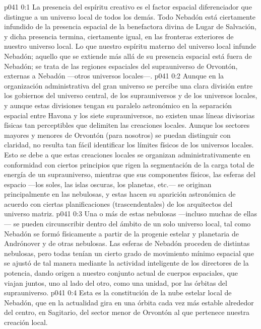 \author{Arcángel}
\vs p041 0:1 La presencia del espíritu creativo es el factor espacial diferenciador que distingue a un universo local de todos los demás. Todo Nebadón está ciertamente infundido de la presencia espacial de la benefactora divina de Lugar de Salvación, y dicha presencia termina, ciertamente igual, en las fronteras exteriores de nuestro universo local. Lo que nuestro espíritu materno del universo local infunde  Nebadón; aquello que se extiende más allá de su presencia espacial está fuera de Nebadón; se trata de las regiones espaciales del suprauniverso de Orvontón, externas a Nebadón ---otros universos locales---.
\vs p041 0:2 \pc Aunque en la organización administrativa del gran universo se percibe una clara división entre los gobiernos del universo central, de los suprauniversos y de los universos locales, y aunque estas divisiones tengan su paralelo astronómico en la separación espacial entre Havona y los siete suprauniversos, no existen unas líneas divisorias físicas tan perceptibles que delimiten las creaciones locales. Aunque los sectores mayores y menores de Orvontón (para nosotros) se puedan distinguir con claridad, no resulta tan fácil identificar los límites físicos de los universos locales. Esto se debe a que estas creaciones locales se organizan administrativamente en conformidad con ciertos principios  que rigen la segmentación de la carga total de energía de un suprauniverso, mientras que sus componentes físicos, las esferas del espacio ---los soles, las islas oscuras, los planetas, etc.--- se originan principalmente en las nebulosas, y estas hacen su aparición astronómica de acuerdo con ciertas planificaciones  (trascendentales) de los arquitectos del universo matriz.
\vs p041 0:3 Una o más de estas nebulosas ---incluso muchas de ellas--- se pueden circunscribir dentro del ámbito de un solo universo local, tal como Nebadón se formó físicamente a partir de la progenie estelar y planetaria de Andrónover y de otras nebulosas. Las esferas de Nebadón proceden de distintas nebulosas, pero todas tenían un cierto grado de movimiento mínimo espacial que se ajustó de tal manera mediante la actividad inteligente de los directores de la potencia, dando origen a nuestro conjunto actual de cuerpos espaciales, que viajan juntos, uno al lado del otro, como una unidad, por las órbitas del suprauniverso.
\vs p041 0:4 Esta es la constitución de la nube estelar local de Nebadón, que en la actualidad gira en una órbita cada vez más estable alrededor del centro, en Sagitario, del sector menor de Orvontón al que pertenece nuestra creación local.
